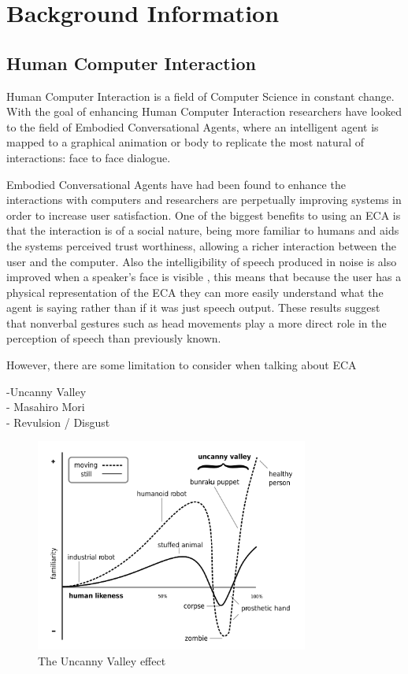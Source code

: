 \documentclass[bsc,frontabs,twoside,singlespacing,parskip]{infthesis}
\begin{document}
\chapter{Background Information}

\section{Human Computer Interaction}

Human Computer Interaction is a field of Computer Science in constant change. With the goal of enhancing Human Computer Interaction researchers have looked to the field of Embodied Conversational Agents, where an intelligent agent is mapped to a graphical animation or body to replicate the most natural of interactions: face to face dialogue. \cite{ecas}

Embodied Conversational Agents have had been found to enhance the interactions with computers \cite{conv_agents} and researchers are perpetually improving systems in order to increase user satisfaction. One of the biggest benefits to using an ECA is that the interaction is of a social nature, being more familiar to humans and aids the systems perceived trust worthiness, allowing a richer interaction between the user and the computer. Also the intelligibility of speech produced in noise is also improved when a speaker's face is visible \cite{emotion_head_motion}, this means that because the user has a physical representation of the ECA they can more easily understand what the agent is saying rather than if it was just speech output. These results suggest that nonverbal gestures such as head movements play a more direct role in the perception of speech than previously known. \cite{vis_prosody}

However, there are some limitation to consider when talking about ECA

-Uncanny Valley \\
- Masahiro Mori\\
- Revulsion / Disgust\\


\begin{figure}[h!]
	\centering
	\includegraphics[width=0.8\textwidth]{uncanny}
	\caption{The Uncanny Valley effect}
\end{figure}
\end{document}
